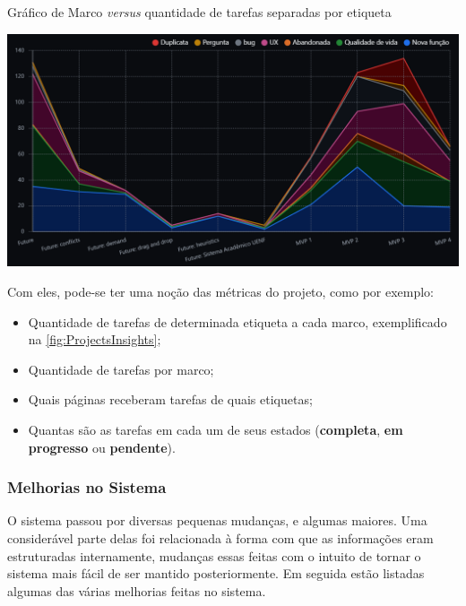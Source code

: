 \begin{MyCenteredFigure}
  \caption{Gráfico de Marco \textit{versus} quantidade de tarefas separadas por etiqueta}
  \label{fig:ProjectsInsights}
  \includegraphics[width=\textwidth]{files/img/2.02!5-desenvolvimento/2.02!5.1.4-sistema/GitHubProjects-Insights-Stacked_Line-Milestone_Label}
\end{MyCenteredFigure}

Com eles, pode-se ter uma noção das métricas do projeto, como por exemplo:

\begin{itemize}
  \item Quantidade de tarefas de determinada etiqueta a cada marco, exemplificado na \autoref{fig:ProjectsInsights};
  \item Quantidade de tarefas por marco;
  \item Quais páginas receberam tarefas de quais etiquetas;
  \item Quantas são as tarefas em cada um de seus estados (\textbf{completa}, \textbf{em progresso} ou \textbf{pendente}).
\end{itemize}

\subsubsection{Melhorias no Sistema} \label{sssec:Melhorias no Sistema}

O sistema passou por diversas pequenas mudanças, e algumas maiores. Uma considerável parte delas foi relacionada à forma com que as informações eram estruturadas internamente, mudanças essas feitas com o intuito de tornar o sistema mais fácil de ser mantido posteriormente. Em seguida estão listadas algumas das várias melhorias feitas no sistema.

 \label{Filtros e ordenações}


